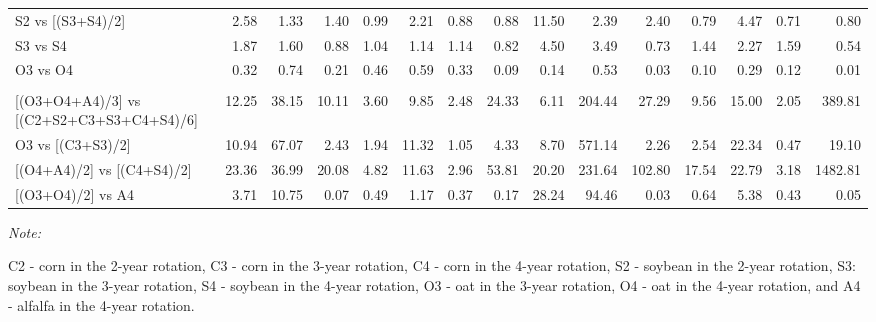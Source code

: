 \documentclass[
]{article}
\begin{document}
\begin{landscape}
\begin{table}
{\begin{threeparttable}
\begin{tabular}[t]{lrrrrrr>{}r|rrrrrrr}
\hspace{1em}S2 vs [(S3+S4)/2] & 2.58 & 1.33 & 1.40 & 0.99 & 2.21 & 0.88 & 0.88 & 11.50 & 2.39 & 2.40 & 0.79 & 4.47 & 0.71 & 0.80\\
\hspace{1em}S3 vs S4 & 1.87 & 1.60 & 0.88 & 1.04 & 1.14 & 1.14 & 0.82 & 4.50 & 3.49 & 0.73 & 1.44 & 2.27 & 1.59 & 0.54\\
\hspace{1em}O3 vs O4 & 0.32 & 0.74 & 0.21 & 0.46 & 0.59 & 0.33 & 0.09 & 0.14 & 0.53 & 0.03 & 0.10 & 0.29 & 0.12 & 0.01\\
\addlinespace[0.3em]
\multicolumn{15}{l}{\textbf{(C) - Crop type effects}}\\
\hspace{1em}{}[(O3+O4+A4)/3] vs [(C2+S2+C3+S3+C4+S4)/6] & 12.25 & 38.15 & 10.11 & 3.60 & 9.85 & 2.48 & 24.33 & 6.11 & 204.44 & 27.29 & 9.56 & 15.00 & 2.05 & 389.81\\
\hspace{1em}O3 vs [(C3+S3)/2] & 10.94 & 67.07 & 2.43 & 1.94 & 11.32 & 1.05 & 4.33 & 8.70 & 571.14 & 2.26 & 2.54 & 22.34 & 0.47 & 19.10\\
\hspace{1em}{}[(O4+A4)/2] vs [(C4+S4)/2] & 23.36 & 36.99 & 20.08 & 4.82 & 11.63 & 2.96 & 53.81 & 20.20 & 231.64 & 102.80 & 17.54 & 22.79 & 3.18 & 1482.81\\
\hspace{1em}{}[(O3+O4)/2] vs A4 & 3.71 & 10.75 & 0.07 & 0.49 & 1.17 & 0.37 & 0.17 & 28.24 & 94.46 & 0.03 & 0.64 & 5.38 & 0.43 & 0.05\\
\bottomrule
\end{tabular}
\begin{tablenotes}[para]
\item \textit{Note: } 
\item C2 - corn in the 2-year rotation, C3 - corn in the 3-year rotation, C4 - corn in the 4-year rotation, S2 - soybean in the 2-year rotation, S3: soybean in the 3-year rotation, S4 - soybean in the 4-year rotation, O3 - oat in the 3-year rotation, O4 - oat in the 4-year rotation, and A4 - alfalfa in the 4-year rotation.
\end{tablenotes}
\end{threeparttable}}
\end{table}
\end{landscape}
\end{document}

